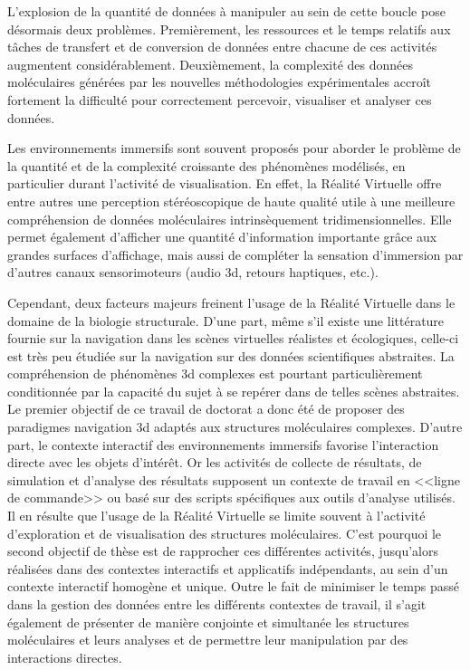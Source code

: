 L’explosion de la quantité de données à manipuler au sein de cette boucle pose désormais deux problèmes. Premièrement, les ressources et le temps relatifs aux tâches de transfert et de conversion de données entre chacune de ces activités augmentent considérablement. Deuxièmement, la complexité des données moléculaires générées par les nouvelles méthodologies expérimentales accroît fortement la difficulté pour correctement percevoir, visualiser et analyser ces données.

Les environnements immersifs sont souvent proposés pour aborder le problème de la quantité et de la complexité croissante des phénomènes modélisés, en particulier durant l’activité de visualisation. En effet, la Réalité Virtuelle offre entre autres une perception stéréoscopique de haute qualité utile à une meilleure compréhension de données moléculaires intrinsèquement tridimensionnelles. Elle permet également d’afficher une quantité d’information importante grâce aux grandes surfaces d’affichage, mais aussi de compléter la sensation d’immersion par d’autres canaux sensorimoteurs (audio 3d, retours haptiques, etc.).

Cependant, deux facteurs majeurs freinent l’usage de la Réalité Virtuelle dans le domaine de la biologie structurale. D’une part, même s’il existe une littérature fournie sur la navigation dans les scènes virtuelles réalistes et écologiques, celle-ci est très peu étudiée sur la navigation sur des données scientifiques abstraites. La compréhension de phénomènes 3d complexes est pourtant particulièrement conditionnée par la capacité du sujet à se repérer dans de telles scènes abstraites. Le premier objectif de ce travail de doctorat a donc été de proposer des paradigmes navigation 3d adaptés aux structures moléculaires complexes. D’autre part, le contexte interactif des environnements immersifs favorise l’interaction directe avec les objets d’intérêt. Or les activités de collecte de résultats, de simulation et d’analyse des résultats supposent un contexte de travail en <<ligne de commande>> ou basé sur des scripts spécifiques aux outils d’analyse utilisés. Il en résulte que l’usage de la Réalité Virtuelle se limite souvent à l’activité d’exploration et de visualisation des structures moléculaires. C’est pourquoi le second objectif de thèse est de rapprocher ces différentes activités, jusqu’alors réalisées dans des contextes interactifs et applicatifs indépendants, au sein d’un contexte interactif homogène et unique. Outre le fait de minimiser le temps passé dans la gestion des données entre les différents contextes de travail, il s’agit également de présenter de manière conjointe et simultanée les structures moléculaires et leurs analyses et de permettre leur manipulation par des interactions directes.

